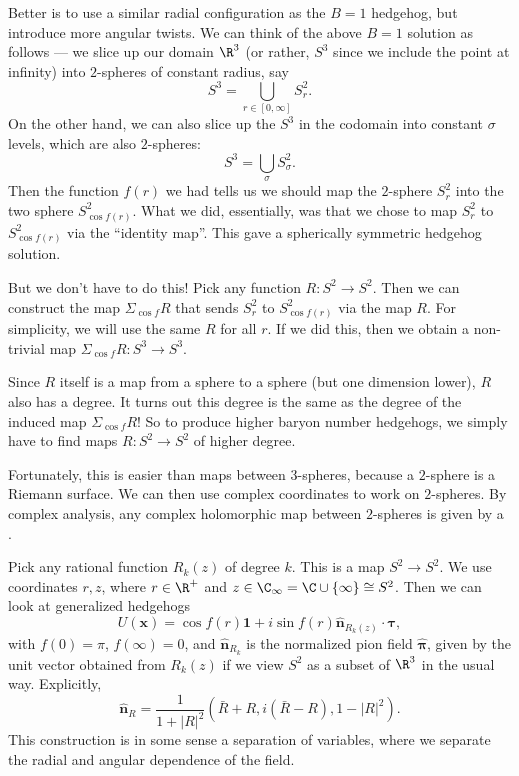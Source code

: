 \documentclass[a4paper]{article}
\begin{document}
Better is to use a similar radial configuration as the $B = 1$ hedgehog, but introduce more angular twists. We can think of the above $B = 1$ solution as follows --- we slice up our domain $\R^3$ (or rather, $S^3$ since we include the point at infinity) into $2$-spheres of constant radius, say
\[
  S^3 = \bigcup_{r \in [0, \infty]} S_r^2.
\]
On the other hand, we can also slice up the $S^3$ in the codomain into constant $\sigma$ levels, which are also $2$-spheres:
\[
  S^3 = \bigcup_{\sigma} S_\sigma^2.
\]
Then the function $f(r)$ we had tells us we should map the $2$-sphere $S_r^2$ into the two sphere $S_{\cos f(r)}^2$. What we did, essentially, was that we chose to map $S_r^2$ to $S_{\cos f(r)}^2$ via the ``identity map''. This gave a spherically symmetric hedgehog solution.

But we don't have to do this! Pick any function $R: S^2 \to S^2$. Then we can construct the map $\Sigma_{\cos f} R$ that sends $S_r^2$ to $S_{\cos f(r)}^2$ via the map $R$. For simplicity, we will use the same $R$ for all $r$. If we did this, then we obtain a non-trivial map $\Sigma_{\cos f} R: S^3 \to S^3$.

Since $R$ itself is a map from a sphere to a sphere (but one dimension lower), $R$ also has a degree. It turns out this degree is the same as the degree of the induced map $\Sigma_{\cos f} R$! So to produce higher baryon number hedgehogs, we simply have to find maps $R: S^2 \to S^2$ of higher degree.

Fortunately, this is easier than maps between $3$-spheres, because a $2$-sphere is a Riemann surface. We can then use complex coordinates to work on $2$-spheres. By complex analysis, any complex holomorphic map between $2$-spheres is given by a .

Pick any rational function $R_k(z)$ of degree $k$. This is a map $S^2 \to S^2$. We use coordinates $r, z$, where $r \in \R^+$ and $z \in \C_\infty = \C \cup \{\infty\} \cong S^2$. Then we can look at generalized hedgehogs
\[
  U(\mathbf{x}) = \cos f(r) \mathbf{1} + i \sin f(r) \hat{\mathbf{n}}_{R_k(z)} \cdot \boldsymbol\tau,
\]
with $f(0) = \pi$, $f(\infty) = 0$, and $\hat{\mathbf{n}}_{R_k}$ is the normalized pion field $\hat{\boldsymbol\pi}$, given by the unit vector obtained from $R_k(z)$ if we view $S^2$ as a subset of $\R^3$ in the usual way. Explicitly,
\[
  \hat{\mathbf{n}}_R = \frac{1}{1 + |R|^2} (\bar{R} + R, i (\bar{R} - R), 1 - |R|^2).
\]
This construction is in some sense a separation of variables, where we separate the radial and angular dependence of the field.
\end{document}
